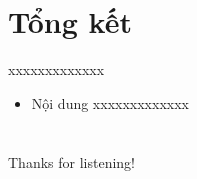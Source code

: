 \documentclass{beamer}
\begin{document}
\section{Tổng kết}
\begin{frame}{xxxxxxxxxxxxx}
\begin{itemize}
\item Nội dung xxxxxxxxxxxxx
\end{itemize}
\end{frame}
 
\section*{}
\begin{frame}{}
\centering
\Huge{Thanks for listening!}
\end{frame}
\end{document}
